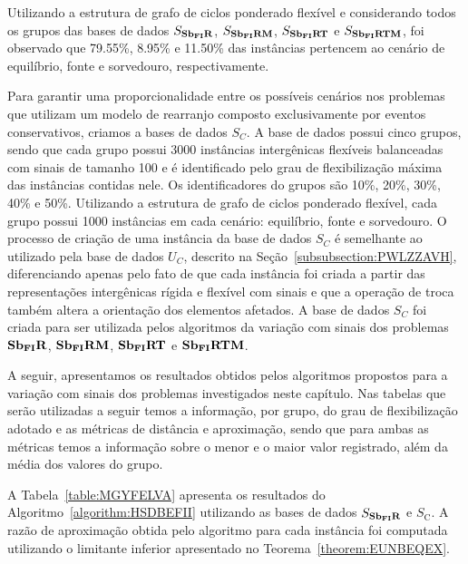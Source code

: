 Utilizando a estrutura de grafo de ciclos ponderado flexível e considerando todos os grupos das bases de dados $S_{\textbf{Sb\textsubscript{FI}R}}{}$, $S_{\textbf{Sb\textsubscript{FI}RM}}{}$, $S_{\textbf{Sb\textsubscript{FI}RT}}{}$ e $S_{\textbf{Sb\textsubscript{FI}RTM}}{}$, foi observado que 79.55\%,  8.95\% e 11.50\% das instâncias pertencem ao cenário de equilíbrio, fonte e sorvedouro, respectivamente. 

Para garantir uma proporcionalidade entre os possíveis cenários nos problemas que utilizam um modelo de rearranjo composto exclusivamente por eventos conservativos, criamos a bases de dados $S_{C}$. A base de dados possui cinco grupos, sendo que cada grupo possui 3000 instâncias intergênicas flexíveis balanceadas com sinais de tamanho 100 e é identificado pelo grau de flexibilização máxima das instâncias contidas nele. Os identificadores do grupos são 10\%, 20\%, 30\%, 40\% e 50\%. Utilizando a estrutura de grafo de ciclos ponderado flexível, cada grupo possui 1000 instâncias em cada cenário: equilíbrio, fonte e sorvedouro. O processo de criação de uma instância da base de dados $S_{C}$ é semelhante ao utilizado pela base de dados $U_{C}$, descrito na Seção~\ref{subsubsection:PWLZZAVH}, diferenciando apenas pelo fato de que cada instância foi criada a partir das representações intergênicas rígida e flexível com sinais e que a operação de troca também altera a orientação dos elementos afetados. A base de dados $S_{C}$ foi criada para ser utilizada pelos algoritmos da variação com sinais dos problemas $\textbf{Sb\textsubscript{FI}R}{}$, $\textbf{Sb\textsubscript{FI}RM}{}$, $\textbf{Sb\textsubscript{FI}RT}{}$ e $\textbf{Sb\textsubscript{FI}RTM}{}$.

A seguir, apresentamos os resultados obtidos pelos algoritmos propostos para a variação com sinais dos problemas investigados neste capítulo. Nas tabelas que serão utilizadas a seguir temos a informação, por grupo, do grau de flexibilização adotado e as métricas de distância e aproximação, sendo que para ambas as métricas temos a informação sobre o menor e o maior valor registrado, além da média dos valores do grupo.

A Tabela~\ref{table:MGYFELVA} apresenta os resultados do Algoritmo~\ref{algorithm:HSDBEFII} utilizando as bases de dados $S_{\textbf{Sb\textsubscript{FI}R}}{}$ e $S_{\text{C}}$. A razão de aproximação obtida pelo algoritmo para cada instância foi computada utilizando o limitante inferior apresentado no Teorema~\ref{theorem:EUNBEQEX}.



